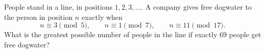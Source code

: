 People stand in a line, in positions $1,2,3,\dots$. A company gives free dogwater to the person in position $n$ exactly when
\[n\equiv3\pmod5,\qquad n\equiv1\pmod7,\qquad n\equiv11\pmod{17}.\]
What is the greatest possible number of people in the line if exactly $69$ people get free dogwater?
